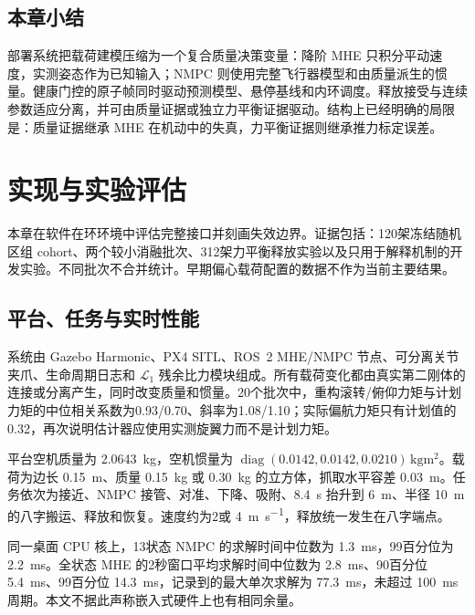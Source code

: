 \documentclass[11pt,UTF8,fontset=none]{ctexrep}
\begin{document}
\section{本章小结}

部署系统把载荷建模压缩为一个复合质量决策变量：降阶 MHE 只积分平动速度，实测姿态作为已知输入；NMPC 则使用完整飞行器模型和由质量派生的惯量。健康门控的原子帧同时驱动预测模型、悬停基线和内环调度。释放接受与连续参数适应分离，并可由质量证据或独立力平衡证据驱动。结构上已经明确的局限是：质量证据继承 MHE 在机动中的失真，力平衡证据则继承推力标定误差。

\chapter{实现与实验评估}

本章在软件在环环境中评估完整接口并刻画失效边界。证据包括：120架冻结随机区组 cohort、两个较小消融批次、312架力平衡释放实验以及只用于解释机制的开发实验。不同批次不合并统计。早期偏心载荷配置的数据不作为当前主要结果。

\section{平台、任务与实时性能}

系统由 Gazebo Harmonic、PX4 SITL、ROS~2 MHE/NMPC 节点、可分离关节夹爪、生命周期日志和 $\mathcal L_1$ 残余比力模块组成。所有载荷变化都由真实第二刚体的连接或分离产生，同时改变质量和惯量。20个批次中，重构滚转/俯仰力矩与计划力矩的中位相关系数为0.93/0.70、斜率为1.08/1.10；实际偏航力矩只有计划值的0.32，再次说明估计器应使用实测旋翼力而不是计划力矩。

平台空机质量为 \SI{2.0643}{\kg}，空机惯量为 $\operatorname{diag}(0.0142,0.0142,0.0210)\,\si{\kg\meter\squared}$。载荷为边长 \SI{0.15}{\meter}、质量 \SI{0.15}{\kg} 或 \SI{0.30}{\kg} 的立方体，抓取水平容差 \SI{0.03}{\meter}。任务依次为接近、NMPC 接管、对准、下降、吸附、\SI{8.4}{\second} 抬升到 \SI{6}{\meter}、半径 \SI{10}{\meter} 的八字搬运、释放和恢复。速度约为2或 \SI{4}{\meter\per\second}，释放统一发生在八字端点。

同一桌面 CPU 核上，13状态 NMPC 的求解时间中位数为 \SI{1.3}{\milli\second}，99百分位为 \SI{2.2}{\milli\second}。全状态 MHE 的2秒窗口平均求解时间中位数为 \SI{2.8}{\milli\second}、90百分位 \SI{5.4}{\milli\second}、99百分位 \SI{14.3}{\milli\second}，记录到的最大单次求解为 \SI{77.3}{\milli\second}，未超过 \SI{100}{\milli\second} 周期。本文不据此声称嵌入式硬件上也有相同余量。
\end{document}
